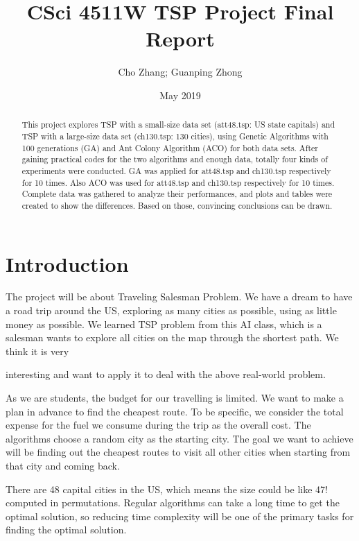 \documentclass{article}
\title{CSci 4511W TSP Project Final Report}
\author{Cho Zhang; Guanping Zhong}
\date{May 2019}
\begin{document}
\maketitle


\begin{abstract}
This project explores TSP with a small-size data set (att48.tsp: US state capitals) and TSP with a large-size data set (ch130.tsp: 130 cities), using Genetic Algorithms with 100 generations (GA) and Ant Colony Algorithm (ACO) for both data sets. After gaining practical codes for the two algorithms and enough data, totally four kinds of experiments were conducted. GA was applied for att48.tsp and ch130.tsp respectively for 10 times. Also ACO was used for att48.tsp and ch130.tsp respectively for 10 times. Complete data was gathered to analyze their performances, and plots and tables were created to show the differences. Based on those, convincing conclusions can be drawn. 
\end{abstract}

\bigskip

\section{Introduction}
The project will be about Traveling Salesman Problem. We have a dream to have a road trip around the US, exploring as many cities as possible, using as little money as possible. We learned TSP problem from this AI class, which is a salesman wants to explore all cities on the map through the shortest path. We think it is very

interesting and want to apply it to deal with the above real-world problem.

As we are students, the budget for our travelling is limited. We want to make a plan in advance to find the cheapest route. To be specific, we consider the total expense for the fuel we consume during the trip as the overall cost. The algorithms choose a random city as the starting city. The goal we want to achieve will be finding out the cheapest routes to visit all other cities when starting from that city and coming back.

There are 48 capital cities in the US, which means the size could be like 47! computed in permutations. Regular algorithms can take a long time to get the optimal solution, so reducing time complexity will be one of the primary tasks for finding the optimal solution.
\end{document}
